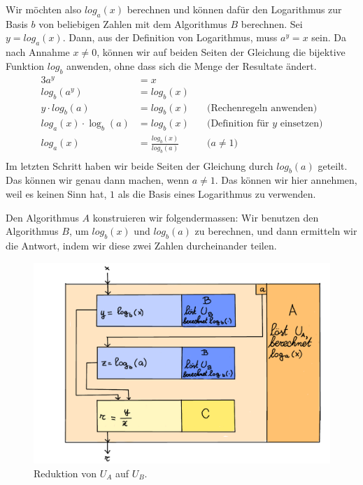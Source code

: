 \documentclass[
	12pt, %
	german, %
]{fphw}
\begin{document}
Wir möchten also \(log_a(x)\) berechnen und können dafür den Logarithmus zur Basis \(b\) von beliebigen Zahlen mit dem Algorithmus \(B\) berechnen. Sei \(y = log_a(x)\). Dann, aus der Definition von Logarithmus, muss \(a^y = x\) sein. Da nach Annahme \(x \neq 0 \), können wir auf beiden Seiten der Gleichung die bijektive Funktion \(log_b\) anwenden, ohne dass sich die Menge der Resultate ändert.
\begin{alignat*}{3}
a^y &= x & \\
log_b(a^y) &= log_b(x) & \\
y \cdot log_b(a) &= log_b(x) & \quad \text{(Rechenregeln anwenden)} \\
log_a(x) \cdot \log_b(a) &= log_b(x) & \quad \text{(Definition für \(y\) einsetzen)}\\
log_a(x) &= \frac{log_b(x)}{log_b(a)} & \quad \text{(\(a \neq 1\))}\\
\end{alignat*}
Im letzten Schritt haben wir beide Seiten der Gleichung durch \(log_b(a)\) geteilt. Das können wir genau dann machen, wenn \(a \neq 1\). Das können wir hier annehmen, weil es keinen Sinn hat, \(1\) als die Basis eines Logarithmus zu verwenden.

Den Algorithmus \(A\) konstruieren wir folgendermassen: Wir benutzen den Algorithmus \(B\), um \(log_b(x)\) und \(log_b(a)\) zu berechnen, und dann ermitteln wir die Antwort, indem wir diese zwei Zahlen durcheinander teilen.

\begin{figure}[H]
	\centering
	\includegraphics[width=\textwidth]{Positiv.png}
	\caption{Reduktion von \(U_A\) auf \(U_B\).}
\end{figure}
\end{document}
